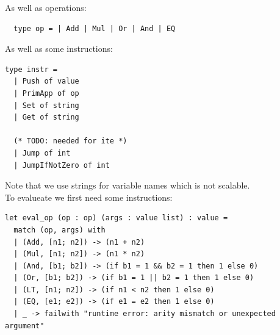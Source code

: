As well as operations:
\begin{lstlisting}
  type op = | Add | Mul | Or | And | EQ
\end{lstlisting}
As well as some instructions:
\begin{lstlisting}
type instr =
  | Push of value
  | PrimApp of op
  | Set of string
  | Get of string

  (* TODO: needed for ite *)
  | Jump of int
  | JumpIfNotZero of int
\end{lstlisting}
Note that we use strings for variable names which is not scalable.
\\
To evalueate we first need some instructions:
\begin{lstlisting}
let eval_op (op : op) (args : value list) : value =
  match (op, args) with
  | (Add, [n1; n2]) -> (n1 + n2)
  | (Mul, [n1; n2]) -> (n1 * n2)
  | (And, [b1; b2]) -> (if b1 = 1 && b2 = 1 then 1 else 0)
  | (Or, [b1; b2]) -> (if b1 = 1 || b2 = 1 then 1 else 0)
  | (LT, [n1; n2]) -> (if n1 < n2 then 1 else 0)
  | (EQ, [e1; e2]) -> (if e1 = e2 then 1 else 0)
  | _ -> failwith "runtime error: arity mismatch or unexpected argument"
\end{lstlisting}
